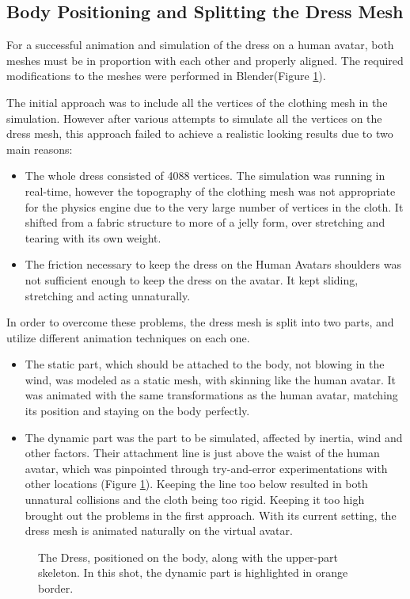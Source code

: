 \subsection{Body Positioning and Splitting the Dress Mesh}

For a successful animation and simulation of the dress on a human avatar, both meshes must be in proportion with each other and properly aligned. 
The required modifications to the meshes were performed in Blender(Figure \ref{fig:dress_and_body}).

The initial approach was to include all the vertices of the clothing mesh in the simulation. However after various attempts to simulate all the vertices on the dress mesh,
 this approach failed to achieve a realistic looking results due to two main reasons:
\begin{itemize}
  \item The whole dress consisted of 4088 vertices. The simulation was running in real-time, however the topography of the clothing mesh was not appropriate for the physics engine due 
  to the very large number of vertices in the cloth. It shifted from a fabric structure to more of a jelly form, over stretching and tearing with its own weight.
  \item The friction necessary to keep the dress on the Human Avatars shoulders was not sufficient enough to keep the dress on the avatar. It kept sliding, stretching and acting unnaturally.
\end{itemize}

In order to overcome these problems, the dress mesh is split into two parts, and utilize different animation techniques on each one.

\begin{itemize}
  \item The static part, which should be attached to the body, not blowing in the wind, was modeled as a static mesh, with skinning like the human avatar. 
  It was animated with the same transformations as the human avatar, matching its position and staying on the body perfectly.
  \item The dynamic part was the part to be simulated, affected by inertia, wind and other factors. Their attachment line is just above the waist
   of the human avatar, which was pinpointed through try-and-error experimentations with other locations (Figure \ref{fig:dress_and_body}). 
   Keeping the line too below resulted in both unnatural collisions and the cloth being too rigid. Keeping it too high brought out the problems in the first approach.
    With its current setting, the dress mesh is animated naturally on the virtual avatar.
\end{itemize}

\begin{figure}[h]
\centerline{}
\caption{The  Dress, positioned on the body, along with the upper-part skeleton. In this shot, the dynamic part is highlighted in orange border.}
\label{fig:dress_and_body}
\end{figure}

